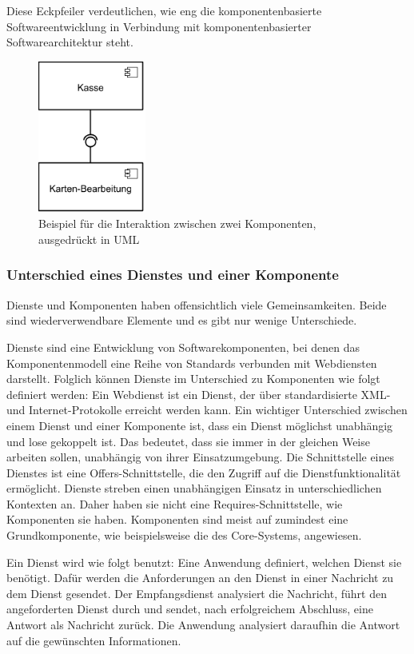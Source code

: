 Diese Eckpfeiler verdeutlichen, wie eng die komponentenbasierte Softwareentwicklung in Verbindung mit komponentenbasierter Softwarearchitektur steht.

\begin{figure}[h]
\centering
\includegraphics[height=5.0cm]{images/CBSE.png}
\caption[
Beispiel für die Interaktion zwischen zwei Komponenten, ausgedrückt in UML
]{Beispiel für die Interaktion zwischen zwei Komponenten, ausgedrückt in UML}
\label{fig:2_CBSE}
\end{figure}

\subsubsection{Unterschied eines Dienstes und einer Komponente}
\label{sec:2_Unterschied_Dienst_Komponente}
Dienste und Komponenten haben offensichtlich viele Gemeinsamkeiten. Beide sind wiederverwendbare Elemente und es gibt nur wenige Unterschiede.

Dienste sind eine Entwicklung von Softwarekomponenten, bei denen das Komponentenmodell eine Reihe von Standards verbunden mit Webdiensten darstellt. Folglich können Dienste im Unterschied zu Komponenten wie folgt definiert werden:
Ein Webdienst ist ein Dienst, der über standardisierte XML- und Internet-Protokolle erreicht werden kann. Ein wichtiger Unterschied zwischen einem Dienst und einer Komponente ist, dass ein Dienst möglichst unabhängig und lose gekoppelt ist. Das bedeutet, dass sie immer in der gleichen Weise arbeiten sollen, unabhängig von ihrer Einsatzumgebung. Die Schnittstelle eines Dienstes ist eine \glqq Offers\grqq -Schnittstelle, die den Zugriff auf die Dienstfunktionalität ermöglicht. Dienste streben einen unabhängigen Einsatz in unterschiedlichen Kontexten an. Daher haben sie nicht eine \glqq Requires\grqq -Schnittstelle, wie Komponenten sie haben. Komponenten sind meist auf zumindest eine \glqq Grundkomponente\grqq , wie beispielsweise die des Core-Systems, angewiesen.

Ein Dienst wird wie folgt benutzt:
Eine Anwendung definiert, welchen Dienst sie benötigt. Dafür werden die Anforderungen an den Dienst in einer Nachricht zu dem Dienst gesendet. Der Empfangsdienst analysiert die Nachricht, führt den angeforderten Dienst durch und sendet, nach erfolgreichem Abschluss, eine Antwort als Nachricht zurück. Die Anwendung analysiert daraufhin die Antwort auf die gewünschten Informationen.

